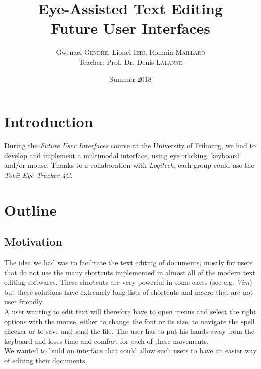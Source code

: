 \documentclass[12pt, a4paper]{article}
\title{\huge{\textbf{Eye-Assisted Text Editing }\\ Future User Interfaces}}
\author{Gwenael \textsc{Gendre}, Lionel \textsc{Ieri}, Romain \textsc{Maillard} \\
	Teacher: Prof. Dr. Denis \textsc{Lalanne}}
\date{Summer 2018}
\begin{document}
 
\begin{titlepage}
\maketitle
\end{titlepage}
\tableofcontents


\section{Introduction}
During the \textit{Future User Interfaces} course at the University of Fribourg, we had to develop and implement a multimodal interface, using eye tracking, keyboard and/or mouse. Thanks to a collaboration with \textit{Logitech}, each group could use the \textit{Tobii Eye Tracker 4C}. 

\section{Outline}

\subsection{Motivation}
The idea we had was to facilitate the text editing of documents, mostly for users that do not use the many shortcuts implemented in almost all of the modern text editing softwares. These shortcuts are very powerful in some cases (see e.g. \textit{Vim}) but these solutions have extremely long lists of shortcuts and macro that are not user friendly.\\
A user wanting to edit text will therefore have to open menus and select the right options with the mouse, either to change the font or its size, to navigate the spell checker or to save and send the file. The user has to put his hands away from the keyboard and loses time and comfort for each of these movements. \\
We wanted to build an interface that could allow such users to have an easier way of editing their documents. 
\end{document}
